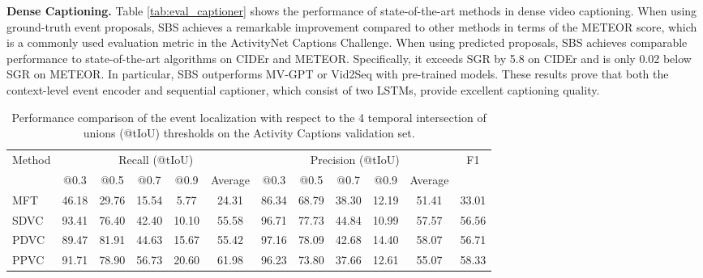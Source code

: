 \textbf{Dense Captioning.}
Table \ref{tab:eval_captioner} shows the performance of state-of-the-art methods in dense video captioning.
When using ground-truth event proposals, SBS achieves a remarkable improvement compared to other methods in terms of the METEOR score, which is a commonly used evaluation metric in the ActivityNet Captions Challenge.
When using predicted proposals, SBS achieves comparable performance to state-of-the-art algorithms on CIDEr and METEOR.
Specifically, it exceeds SGR by 5.8 on CIDEr and is only 0.02 below SGR on METEOR.
In particular, SBS outperforms MV-GPT or Vid2Seq with pre-trained models.
These results prove that both the context-level event encoder and sequential captioner, which consist of two LSTMs, provide excellent captioning quality.

\begin{sidewaystable}
  \centering
  \caption{
    Performance comparison of the event localization with respect to the 4 temporal intersection of unions (@tIoU) thresholds on the Activity Captions validation set.
  }
  \begin{tabular}{@{}l|ccccc|ccccc|c@{}}
    \hline
    \multirow{2}{*}{Method}        & \multicolumn{5}{|c|}{Recall (@tIoU)} & \multicolumn{5}{|c|}{Precision (@tIoU)} & \multirow{2}{*}{F1}                                                                     \\
                                   & @0.3                                 & @0.5                                    & @0.7                & @0.9  & Average & @0.3  & @0.5  & @0.7  & @0.9  & Average &       \\
    \hline
    MFT \cite{xiong2018move}       & 46.18                                & 29.76                                   & 15.54               & 5.77  & 24.31   & 86.34 & 68.79 & 38.30 & 12.19 & 51.41   & 33.01 \\
    SDVC \cite{mun2019streamlined} & 93.41                                & 76.40                                   & 42.40               & 10.10 & 55.58   & 96.71 & 77.73 & 44.84 & 10.99 & 57.57   & 56.56 \\
    PDVC \cite{wang2021end}        & 89.47                                & 81.91                                   & 44.63               & 15.67 & 55.42   & 97.16 & 78.09 & 42.68 & 14.40 & 58.07   & 56.71 \\
    PPVC \cite{choi2022parallel}   & 91.71                                & 78.90                                   & 56.73               & 20.60 & 61.98   & 96.23 & 73.80 & 37.66 & 12.61 & 55.07   & 58.33 \\

\end{tabular}
\end{sidewaystable}

